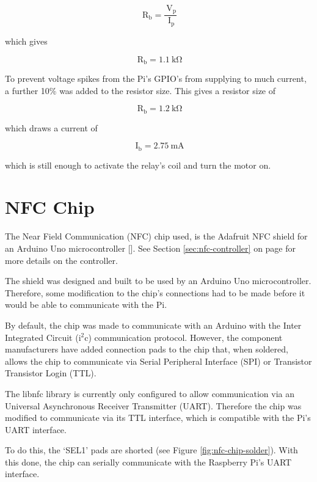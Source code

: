\[
\mathrm{\ R_{b}} = \frac{\mathrm{\ V_{p}}}{\mathrm{\ I_{p}}}
\]

which gives

\[
\mathrm{\ R_{b}} = 1.1\mathrm{\ k\Omega}
\]

To prevent voltage spikes from the Pi's GPIO's from supplying to much current, a
further 10\% was added to the resistor size. This gives a resistor size of

\[\mathrm{\ R_{b}} = 1.2\mathrm{\ k\Omega}\]

which draws a current of 

\[\mathrm{\ I_{b}} = 2.75\mathrm{\ mA} \]

which is still enough to activate the relay's coil and turn the motor on. 

\section{NFC Chip}

The Near Field Communication (NFC) chip used, is the Adafruit NFC shield for an
Arduino Uno microcontroller [\cite{website:adafruit-nfc}]. See Section
\ref{sec:nfc-controller} on page \pageref{sec:nfc-controller} for more details
on the controller.

The shield was designed and built to be used by an Arduino Uno microcontroller.
Therefore, some modification to the chip's connections had to be made before it
would be able to communicate with the Pi.

By default, the chip was made to communicate with an Arduino with the Inter
Integrated Circuit (i$^2$c) communication protocol. However, the component
manufacturers have added connection pads to the chip that, when soldered, allows
the chip to communicate via Serial Peripheral Interface (SPI) or Transistor
Transistor Login (TTL). 

The libnfc library is currently only configured to allow communication via an
Universal Asynchronous Receiver Transmitter (UART). Therefore the chip was
modified to communicate via its TTL interface, which is compatible with the Pi's
UART interface.

To do this, the `SEL1' pads are shorted (see Figure
\ref{fig:nfc-chip-solder}). With this done, the chip can serially communicate
with the Raspberry Pi's UART interface.

